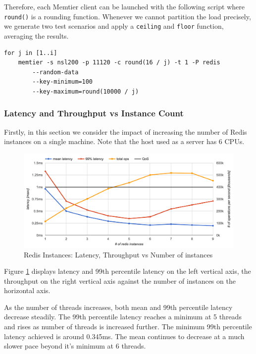 Therefore, each Memtier client can be launched with the following script where \texttt{round()} is a rounding function. Whenever we cannot partition the load precisely, we generate two test scenarios and apply a \texttt{ceiling} and \texttt{floor} function, averaging the results.

\begin{lstlisting}
for j in [1..i]
    memtier -s nsl200 -p 11120 -c round(16 / j) -t 1 -P redis
        --random-data
        --key-minimum=100
        --key-maximum=round(10000 / j)
\end{lstlisting}

\subsubsection{Latency and Throughput vs Instance Count}

Firstly, in this section we consider the impact of increasing the number of Redis instances on a single machine. Note that the host used as a server has 6 CPUs.

\begin{figure}[h]
    \includegraphics[width=\textwidth]{./res/6_instances_latency_ops.png}
    \caption{Redis Instances: Latency, Throughput vs Number of instances}
    \label{fig:redis-instances-latency-ops}
\end{figure}

Figure \ref{fig:redis-instances-latency-ops} displays latency and 99th percentile latency on the left vertical axis, the throughput on the right vertical axis against the number of instances on the horizontal axis.

As the number of threads increases, both mean and 99th percentile latency decrease steadily. The 99th percentile latency reaches a minimum at 5 threads and rises as number of threads is increased further. The minimum 99th percentile latency achieved is around 0.345ms. The mean continues to decrease at a much slower pace beyond it's minimum at 6 threads.

